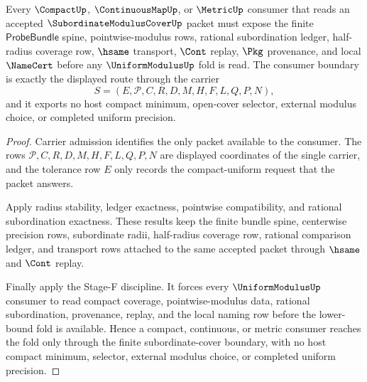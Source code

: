 \begin{theorem}
\label{thm:subordinate-modulus-cover-compact-uniform-consumer-boundary}
Every $\CompactUp$, $\ContinuousMapUp$, or $\MetricUp$ consumer that reads an accepted $\SubordinateModulusCoverUp$ packet must expose the finite $\mathsf{ProbeBundle}$ spine, pointwise-modulus rows, rational subordination ledger, half-radius coverage row, $\hsame$ transport, $\Cont$ replay, $\Pkg$ provenance, and local $\NameCert$ before any $\UniformModulusUp$ fold is read. The consumer boundary is exactly the displayed route through the carrier
$$
S=(E,\mathcal{P},C,R,D,M,H,F,L,Q,P,N),
$$
and it exports no host compact minimum, open-cover selector, external modulus choice, or completed uniform precision.
\end{theorem}
\begin{proof}
Carrier admission identifies the only packet available to the consumer. The rows $\mathcal{P},C,R,D,M,H,F,L,Q,P,N$ are displayed coordinates of the single carrier, and the tolerance row $E$ only records the compact-uniform request that the packet answers.

Apply radius stability, ledger exactness, pointwise compatibility, and rational subordination exactness. These results keep the finite bundle spine, centerwise precision rows, subordinate radii, half-radius coverage row, rational comparison ledger, and transport rows attached to the same accepted packet through $\hsame$ and $\Cont$ replay.

Finally apply the Stage-F discipline. It forces every $\UniformModulusUp$ consumer to read compact coverage, pointwise-modulus data, rational subordination, provenance, replay, and the local naming row before the lower-bound fold is available. Hence a compact, continuous, or metric consumer reaches the fold only through the finite subordinate-cover boundary, with no host compact minimum, selector, external modulus choice, or completed uniform precision.
\end{proof}


